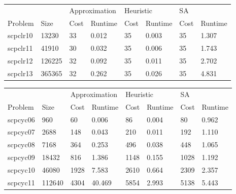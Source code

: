 \documentclass{report}
\begin{document}
\begin{table}[]
\centering
\begin{tabular}{@{}llllllll@{}}
\toprule
         &        & \multicolumn{2}{l}{Approximation} & \multicolumn{2}{l}{Heuristic} & \multicolumn{2}{l}{SA} \\
Problem  & Size   & Cost           & Runtime          & Cost         & Runtime        & Cost     & Runtime     \\ \midrule
scpclr10 & 13230  & 33             & 0.012            & 35           & 0.003          & 35       & 1.307       \\
scpclr11 & 41910  & 30             & 0.032            & 35           & 0.006          & 35       & 1.743       \\
scpclr12 & 126225 & 32             & 0.092            & 35           & 0.011          & 35       & 2.702       \\
scpclr13 & 365365 & 32             & 0.262            & 35           & 0.026          & 35       & 4.831       \\ \bottomrule
\end{tabular}
\end{table}

\begin{table}[]
\centering
\begin{tabular}{@{}llllllll@{}}
\toprule
         &        & \multicolumn{2}{l}{Approximation} & \multicolumn{2}{l}{Heuristic} & \multicolumn{2}{l}{SA} \\
Problem  & Size   & Cost           & Runtime          & Cost         & Runtime        & Cost     & Runtime     \\ \midrule
scpcyc06 & 960    & 60             & 0.006            & 86           & 0.004          & 80       & 0.962       \\
scpcyc07 & 2688   & 148            & 0.043            & 210          & 0.011          & 192      & 1.110       \\
scpcyc08 & 7168   & 364            & 0.253            & 496          & 0.038          & 448      & 1.065       \\
scpcyc09 & 18432  & 816            & 1.386            & 1148         & 0.155          & 1028     & 1.192       \\
scpcyc10 & 46080  & 1928           & 7.583            & 2610         & 0.664          & 2309     & 2.357       \\
scpcyc11 & 112640 & 4304           & 40.469           & 5854         & 2.993          & 5138     & 5.443       \\ \bottomrule
\end{tabular}
\end{table}
\end{document}
